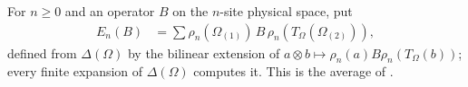 \begin{definition}
    \label{def:glm_wha_average}
    \leanok
    For $n\geq0$ and an operator $B$ on the $n$-site physical space, put
    \begin{align*}
        E_n(B) & =\sum\rho_n(\Omega_{(1)})\,B\,\rho_n(T_\Omega(\Omega_{(2)})),
    \end{align*}
    defined from $\Delta(\Omega)$ by the bilinear extension of
    $a\otimes b\mapsto\rho_n(a)B\rho_n(T_\Omega(b))$; every finite expansion of
    $\Delta(\Omega)$ computes it. This is the average of
    \cite[Appendix~B]{GarreRubio2023MPOSym}.
\end{definition}

